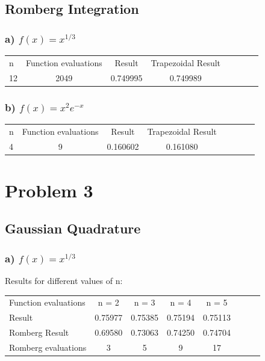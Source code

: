 \documentclass[12pt,letterpaper]{article}
\begin{document}
\subsection*{Romberg Integration}

\subsubsection*{a) $f(x) = x^{1/3}$}

\begin{center}
\begin{tabular}{l*{6}{c}r}
\hline
n 	& Function evaluations 	&	Result 		& Trapezoidal Result 	\\
12	& 2049					&	0.749995	& 0.749989 \\
\hline
\end{tabular}
\end{center}

\subsubsection*{b) $f(x) = x^2e^{-x}$}

\begin{center}
\begin{tabular}{l*{6}{c}r}
\hline
n 	& Function evaluations 	&	Result 		& Trapezoidal Result 	\\
4	& 9						&	0.160602	& 0.161080 				\\
\hline
\end{tabular}
\end{center}


\section*{Problem 3}

\subsection*{Gaussian Quadrature}

\subsubsection*{a) $f(x) = x^{1/3}$} 

Results for different values of n:

\begin{center}
\begin{tabular}{l*{6}{c}r}
\hline
Function evaluations 	    & n = 2 	& n = 3 		& n = 4 		& n = 5\\
Result	 		& 0.75977 	& 0.75385	 	& 0.75194 		& 0.75113\\
\hline
Romberg Result	& 0.69580	& 0.73063		& 0.74250		& 0.74704	\\
Romberg evaluations 		&	3			&	5		&	9		& 17 \\
\hline
\end{tabular}
\end{center}
\end{document}
